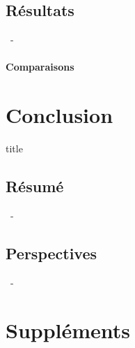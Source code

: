 \documentclass[aspectratio=169, 22pt]{beamer}
\begin{document}
\subsection{Résultats}
\begin{frame}{\secname~- \subsecname}
  \framesubtitle{Comparaisons}
\end{frame}
\section{Conclusion}
\begin{frame}
  \begin{beamercolorbox}[sep=15pt,center,shadow=true,rounded=true]{title}
    \LARGE\bfseries \secname
  \end{beamercolorbox}
\end{frame}

\subsection{Résumé}
\begin{frame}{\secname~- \subsecname}
\end{frame}

\subsection{Perspectives}
\begin{frame}{\secname~- \subsecname}
\end{frame}

\makethanks

\section{Suppléments}
\end{document}
